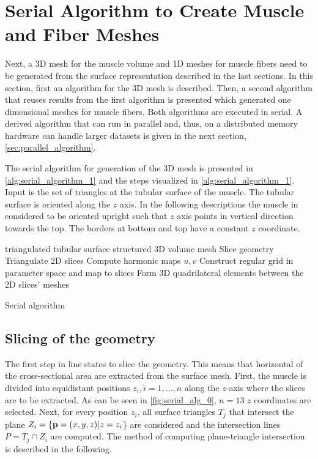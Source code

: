 \section{Serial Algorithm to Create Muscle and Fiber Meshes}\label{sec:ser_alg_meshes}
Next, a 3D mesh for the muscle volume and 1D meshes for muscle fibers need to be generated from the surface representation described in the last sections. In this section, first an algorithm for the 3D mesh is described. Then, a second algorithm that reuses results from the first algorithm is presented which generated one dimensional meshes for muscle fibers. Both algorithms are executed in serial. A derived algorithm that can run in parallel and, thus, on a distributed memory hardware can handle larger datasets is given in the next section, \cref{sec:parallel_algorithm}.

The serial algorithm for generation of the 3D mesh is presented in \cref{alg:serial_algorithm_1} and the steps visualized in \cref{alg:serial_algorithm_1}. Input is the set of triangles at the tubular surface of the muscle. The tubular surface is oriented along the $z$ axis. In the following descriptions the muscle in considered to be oriented upright such that $z$ axis points in vertical direction towards the top. The borders at bottom and top have a constant $z$ coordinate.
%
\begin{algorithm}
  \begin{algorithmic}[1]%
    \Require triangulated tubular surface
    \Ensure structured 3D volume mesh
    \Statex
    \State Slice geometry           \label{alg:1.1}
    \State Triangulate 2D slices      \label{alg:1.2}
    \State Compute harmonic maps $u, v$      \label{alg:1.3}
    \State Construct regular grid in parameter space and map to slices            \label{alg:1.4}
    \State Form 3D quadrilateral elements between the 2D slices’ meshes   \label{alg:1.5}
    \EndProcedure
  \end{algorithmic}%
  \caption{Serial algorithm}%
  \label{alg:serial_algorithm_1}%
\end{algorithm}%

\subsection{Slicing of the geometry}
The first step in line  states to slice the geometry. This means that horizontal  of the cross-sectional area are extracted from the surface mesh. First, the muscle is divided into equidistant positions $z_i, i=1,\dots,n$ along the $z$-axis where the slices are to be extracted. As can be seen in \cref{fig:serial_alg_0}, $n=13$ $z$ coordinates are selected. Next, for every position $z_i$, all surface triangles $T_j$ that intersect the plane $Z_i = \{\textbf{p}=(x,y,z) | z=z_i$\} are considered and the intersection lines $P = T_j \cap Z_i$ are computed. The method of computing plane-triangle intersection is described in the following.

